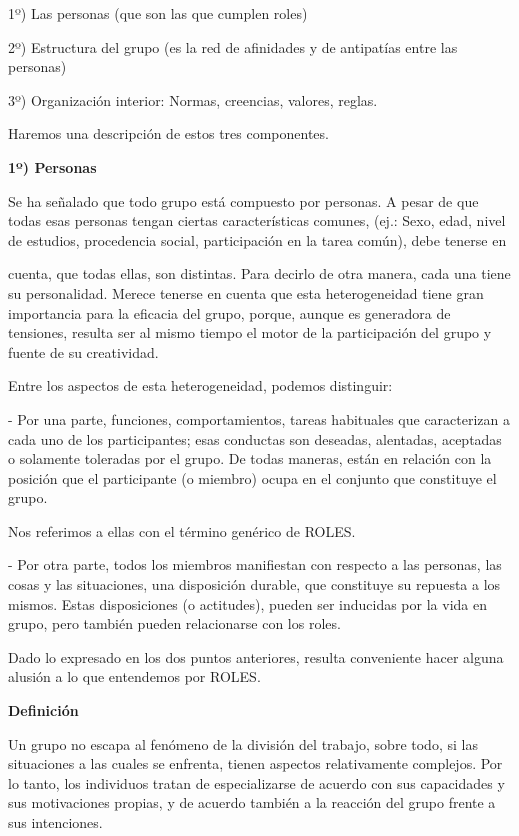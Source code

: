 1º) Las personas (que son las que cumplen roles)

2º) Estructura del grupo (es la red de afinidades y de antipatías entre las personas)

3º) Organización interior: Normas, creencias, valores, reglas.

Haremos una descripción de estos tres componentes.

\textbf{1º) Personas}

Se ha señalado que todo grupo  está compuesto por personas. A pesar de que todas esas personas tengan ciertas características comunes, (ej.: Sexo, edad, nivel de estudios, procedencia social, participación en la tarea común), debe tenerse en



cuenta, que todas ellas, son distintas. Para decirlo de otra manera, cada una tiene su personalidad. Merece tenerse en cuenta que esta heterogeneidad tiene gran importancia para la eficacia del grupo, porque, aunque es generadora de tensiones, resulta ser al mismo tiempo el motor de la participación del grupo y fuente de su creatividad.

Entre los aspectos de esta heterogeneidad, podemos distinguir:

- Por una parte, funciones, comportamientos, tareas habituales que caracterizan a cada uno de los participantes; esas conductas son deseadas, alentadas, aceptadas o solamente toleradas por el grupo. De todas maneras, están en relación con la posición que el participante (o miembro) ocupa en el conjunto que constituye el grupo.

Nos referimos a ellas con el término genérico de ROLES.

- Por otra parte, todos los miembros manifiestan con respecto a las personas, las cosas y las situaciones, una disposición durable, que constituye su repuesta a los mismos. Estas disposiciones (o actitudes), pueden ser inducidas por la vida en grupo, pero también pueden relacionarse con los roles.

Dado lo expresado en los dos puntos anteriores, resulta conveniente hacer alguna alusión a lo que entendemos por ROLES.

\textbf{Definición}

Un grupo no escapa al fenómeno de la división del trabajo, sobre todo, si las situaciones a las cuales se enfrenta, tienen aspectos relativamente complejos. Por lo tanto, los individuos tratan de especializarse de acuerdo con sus capacidades y sus motivaciones propias, y de acuerdo también a la reacción del grupo frente a sus intenciones.

